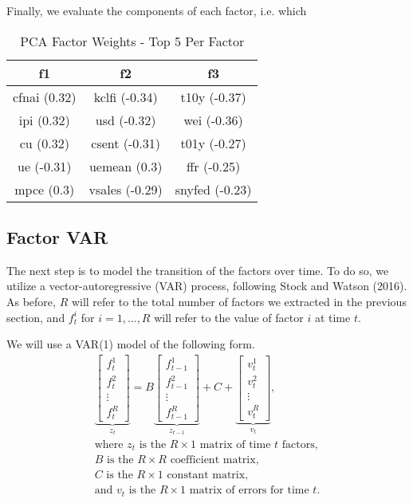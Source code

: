 \documentclass[11pt, letterpaper]{article}\usepackage[]{graphicx}\usepackage[]{color}
\begin{document}
Finally, we evaluate the components of each factor, i.e. which 
\begin{table}[H]
\centering
\begingroup\scriptsize
\begin{tabular}{ccc}
  \hline
f1 & f2 & f3 \\ 
  \hline
cfnai (0.32) & kclfi (-0.34) & t10y (-0.37) \\ 
  ipi (0.32) & usd (-0.32) & wei (-0.36) \\ 
  cu (0.32) & csent (-0.31) & t01y (-0.27) \\ 
  ue (-0.31) & uemean (0.3) & ffr (-0.25) \\ 
  mpce (0.3) & vsales (-0.29) & snyfed (-0.23) \\ 
   \hline
\end{tabular}
\endgroup
\caption{PCA Factor Weights - Top 5 Per Factor} 
\end{table}




\subsection{Factor VAR}
The next step is to model the transition of the factors over time. To do so, we utilize a vector-autoregressive (VAR) process, following Stock and Watson (2016). As before, $R$ will refer to the total number of factors we extracted in the previous section, and $f^i_t$ for $i = 1, \dots, R$ will refer to the value of factor $i$ at time $t$.

We will use a VAR(1) model of the following form.
\begin{align*}
\underbrace{\begin{bmatrix}
	f^1_{t}\\
	f^2_{t}\\
	\vdots \\
	f^R_{t}
\end{bmatrix}}_{z_t}
=
B
\underbrace{\begin{bmatrix}
	f^1_{t-1}\\
	f^2_{t-1}\\
	\vdots \\
	f^R_{t-1}
\end{bmatrix}}_{z_{t-1}}
+
C
+
\underbrace{\begin{bmatrix}
v^1_t\\
v^2_t\\
\vdots\\
v^R_t
\end{bmatrix}}_{v_t},\\
\text{where $z_t$ is the $R \times 1$ matrix of time $t$ factors,}\\
\text{$B$ is the $R \times R$ coefficient matrix,}\\
\text{$C$ is the $R \times 1$ constant matrix,}\\
\text{and $v_t$ is the $R \times 1$ matrix of errors for time $t$.}
\end{align*}
\end{document}

